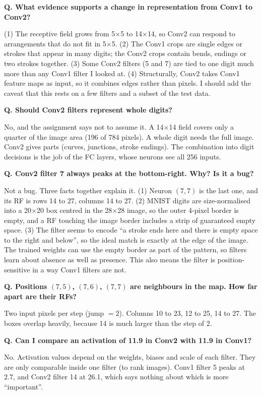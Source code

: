 \documentclass[11pt]{article}
\newcommand{\Q}[1]{\par\vspace{4pt}\noindent\textcolor{qcol}{\textbf{Q. #1}}\par\nopagebreak}
\newcommand{\A}[1]{\noindent #1\par}
\begin{document}
\Q{What evidence supports a change in representation from Conv1 to Conv2?}
\A{(1) The receptive field grows from 5$\times$5 to 14$\times$14, so Conv2 can respond to arrangements that do not fit in 5$\times$5. (2) The Conv1 crops are single edges or strokes that appear in many digits; the Conv2 crops contain bends, endings or two strokes together. (3) Some Conv2 filters (5 and 7) are tied to one digit much more than any Conv1 filter I looked at. (4) Structurally, Conv2 takes Conv1 feature maps as input, so it combines edges rather than pixels. I should add the caveat that this rests on a few filters and a subset of the test data.}

\Q{Should Conv2 filters represent whole digits?}
\A{No, and the assignment says not to assume it. A 14$\times$14 field covers only a quarter of the image area (196 of 784 pixels). A whole digit needs the full image. Conv2 gives parts (curves, junctions, stroke endings). The combination into digit decisions is the job of the FC layers, whose neurons see all 256 inputs.}

\Q{Conv2 filter 7 always peaks at the bottom-right. Why? Is it a bug?}
\A{Not a bug. Three facts together explain it. (1) Neuron $(7,7)$ is the last one, and its RF is rows 14 to 27, columns 14 to 27. (2) MNIST digits are size-normalised into a 20$\times$20 box centred in the 28$\times$28 image, so the outer 4-pixel border is empty, and a RF touching the image border includes a strip of guaranteed empty space. (3) The filter seems to encode ``a stroke ends here and there is empty space to the right and below'', so the ideal match is exactly at the edge of the image. The trained weights can use the empty border as part of the pattern, so filters learn about absence as well as presence. This also means the filter is position-sensitive in a way Conv1 filters are not.}

\Q{Positions $(7,5)$, $(7,6)$, $(7,7)$ are neighbours in the map. How far apart are their RFs?}
\A{Two input pixels per step (jump $=2$). Columns 10 to 23, 12 to 25, 14 to 27. The boxes overlap heavily, because 14 is much larger than the step of 2.}

\Q{Can I compare an activation of 11.9 in Conv2 with 11.9 in Conv1?}
\A{No. Activation values depend on the weights, biases and scale of each filter. They are only comparable inside one filter (to rank images). Conv1 filter 5 peaks at 2.7, and Conv2 filter 14 at 26.1, which says nothing about which is more ``important''.}

\end{document}
